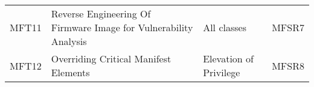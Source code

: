 \begin{longtable}[]{@{}llll@{}}
\begin{minipage}[t]{0.05\columnwidth}
MFT11\strut
\end{minipage} & \begin{minipage}[t]{0.44\columnwidth}\raggedright\strut
Reverse Engineering Of Firmware Image for Vulnerability Analysis\strut
\end{minipage} & \begin{minipage}[t]{0.30\columnwidth}\raggedright\strut
All classes\strut
\end{minipage} & \begin{minipage}[t]{0.09\columnwidth}\raggedright\strut
MFSR7\strut
\end{minipage}\tabularnewline
\begin{minipage}[t]{0.05\columnwidth}\raggedright\strut
MFT12\strut
\end{minipage} & \begin{minipage}[t]{0.44\columnwidth}\raggedright\strut
Overriding Critical Manifest Elements\strut
\end{minipage} & \begin{minipage}[t]{0.30\columnwidth}\raggedright\strut
Elevation of Privilege\strut
\end{minipage} & \begin{minipage}[t]{0.09\columnwidth}\raggedright\strut
MFSR8\strut
\end{minipage}\tabularnewline
\bottomrule
\end{longtable}

